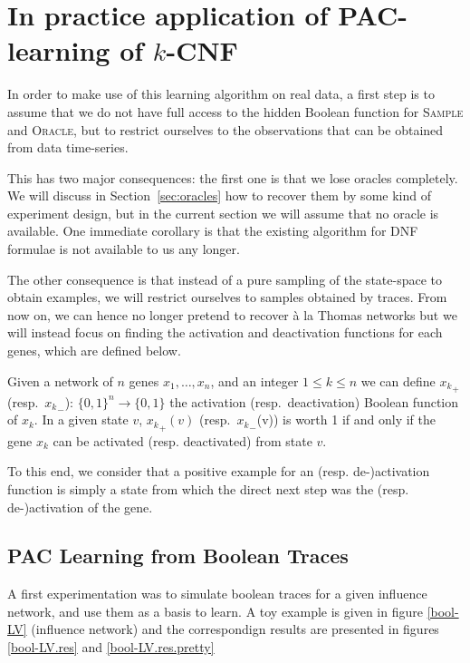 \documentclass{llncs}
\newcommand{\sylvain}[1]{\textcolor{green}{#1}}
\begin{document}


\section{In practice application of PAC-learning of $k$-CNF}


In order to make use of this learning algorithm on real data, a first step is
to assume that we do not have full access to the hidden Boolean function for
\textsc{Sample} and \textsc{Oracle}, but to restrict ourselves to the observations that can be obtained from data time-series.

This has two major consequences: the first one is that we lose oracles
completely. We will discuss in Section~\ref{sec:oracles} how to recover them
by some kind of experiment design, but in the current section we will assume
that no oracle is available. One immediate corollary is that the existing
algorithm for DNF formulae is not available to us any longer.

The other consequence is that instead of a pure sampling of the state-space to
obtain examples, we will restrict ourselves to samples obtained by traces.
From now on, we can hence no longer pretend to recover à la Thomas networks but we will instead focus on finding the activation and deactivation functions for each genes, which are defined below.

\begin{definition}
 	Given a network of $n$ genes $x_1,\ldots,x_n$, and
 	an integer $1 \leq k \leq n$ we can define ${x_k}_+$ (resp.\ ${x_k}_-$):
 	${\{0,1\}}^n \rightarrow\{0,1\}$ the activation (resp.\ deactivation)
 	Boolean function of $x_k$. In a given state $v$, ${x_k}_+(v)$ (resp.\ ${x_k}_-$(v)) is worth 1 if and only if the gene $x_k$ can be activated (resp. deactivated) from state $v$.
\end{definition}

To this end, we consider that a positive example for an (resp. de-)activation function is simply a state from which the direct next step was the (resp. de-)activation of the gene.



\subsection{PAC Learning from Boolean Traces}

A first experimentation was to simulate boolean traces for a given influence network, and use them as a basis to learn. A toy example is given in figure \ref{bool-LV} (influence network) and the correspondign results are presented in figures \ref{bool-LV.res} and \ref{bool-LV.res.pretty}
\end{document}
